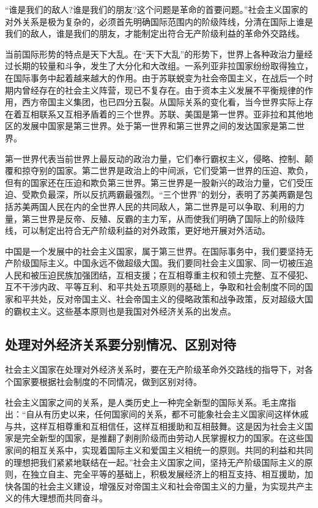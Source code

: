\documentclass{book}
\begin{document}
“谁是我们的敌人?谁是我们的朋友?这个问题是革命的首要问题。”社会主义国家的对外关系是极为复杂的，必须首先明确国际范围内的阶级阵线，分清在国际上谁是我们的敌人，谁是我们的朋友，才能制定出符合无产阶级利益的革命外交路线。

当前国际形势的特点是天下大乱。在“天下大乱”的形势下，世界上各种政治力量经过长期的较量和斗争，发生了大分化和大改组。一系列亚非拉国家纷纷取得独立，在国际事务中起着越来越大的作用。由于苏联蜕变为社会帝国主义，在战后一个时期内曾经存在的社会主义阵营，现已不复存在。由于资本主义发展不平衡规律的作用，西方帝国主义集团，也已四分五裂。从国际关系的变化看，当今世界实际上存在着互相联系又互相矛盾着的三个世界。苏联、美国是第一世界。亚非拉和其他地区的发展中国家是第三世界。处于第一世界和第三世界之间的发达国家是第二世界。

第一世界代表当前世界上最反动的政治力量，它们奉行霸权主义，侵略、控制、颠覆和掠夺别的国家。第二世界是政治上的中间派，它们受第一世界的压迫、欺负，但有的国家还在压迫和欺负第三世界。第三世界是一股新兴的政治力量，它们受压迫、受欺负最深，所以反抗两霸最强烈。“三个世界”的划分，表明了苏美两霸是包括苏美两国人民在内的全世界人民的共同敌人，第二世界是可以争取、利用的力量，第三世界是反帝、反殖、反霸的主力军，从而使我们明确了国际上的阶级阵线，可以制定出符合无产阶级利益的对外政策，更好地开展对外活动。

中国是一个发展中的社会主义国家，属于第三世界。在国际事务中，我们要坚持无产阶级国际主义。中国永远不做超级大国。我们要同社会主义国家、同一切被压追人民和被压迫民族加强团结，互相支援；在互相尊重主权和领土完整、互不侵犯、互不干涉内政、平等互利、和平共处五项原则的基础上，争取和社会制度不同的国家和平共处，反对帝国主义、社会帝国主义的侵略政策和战争政策，反对超级大国的霸权主义。这些基本原则也是我国对外经济关系的出发点。


\subsection{处理对外经济关系要分别情况、区别对待}

社会主义国家在处理对外经济关系时，要在无产阶级革命外交路线的指导下，对各个国家要根据社会制度的不同情况，做到区别对待。

社会主义国家之间的关系，是人类历史上一种完全新型的国际关系。毛主席指出：“自从有历史以来，任何国家间的关系，都不可能象社会主义国家间这样休戚与共，这样互相尊重和互相信任，这样互相援助和互相鼓舞。这是因为社会主义国家是完全新型的国家，是推翻了剥削阶级而由劳动人民掌握权力的国家。在这些国家间的相互关系中，实现着国际主义和爱国主义相统一的原则。共同的利益和共同的理想把我们紧紧地联结在一起。”社会主义国家之间，坚持无产阶级国际主义的原则，在独立自主、完全平等的基础上，积极发展经济上的相互支持、相互援助，加快各国的社会主义建设，增强反对帝国主义和社会帝国主义的力量，为实现共产主义的伟大理想而共同奋斗。
\end{document}
